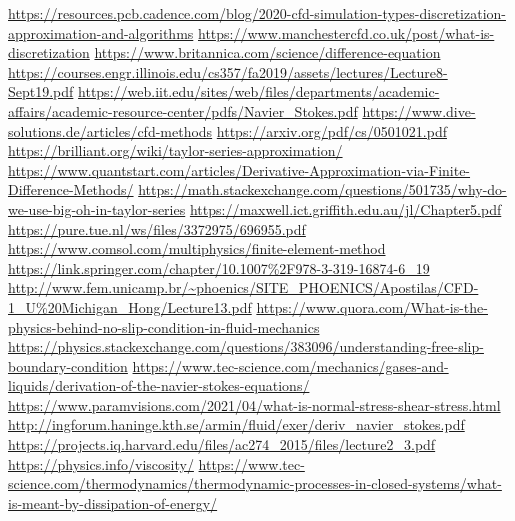 \documentclass{article}
\begin{document}
\newpage
\begin{thebibliography}{3}
\url{https://resources.pcb.cadence.com/blog/2020-cfd-simulation-types-discretization-approximation-and-algorithms}
\url{https://www.manchestercfd.co.uk/post/what-is-discretization}
\url{https://www.britannica.com/science/difference-equation}
\url{https://courses.engr.illinois.edu/cs357/fa2019/assets/lectures/Lecture8-Sept19.pdf}
\url{https://web.iit.edu/sites/web/files/departments/academic-affairs/academic-resource-center/pdfs/Navier_Stokes.pdf}
\url{https://www.dive-solutions.de/articles/cfd-methods}
\url{https://arxiv.org/pdf/cs/0501021.pdf}
\url{https://brilliant.org/wiki/taylor-series-approximation/}
\url{https://www.quantstart.com/articles/Derivative-Approximation-via-Finite-Difference-Methods/}
\url{https://math.stackexchange.com/questions/501735/why-do-we-use-big-oh-in-taylor-series}
\url{https://maxwell.ict.griffith.edu.au/jl/Chapter5.pdf}
\url{https://pure.tue.nl/ws/files/3372975/696955.pdf}
\url{https://www.comsol.com/multiphysics/finite-element-method}
\url{https://link.springer.com/chapter/10.1007\%2F978-3-319-16874-6\_19}
\url{http://www.fem.unicamp.br/~phoenics/SITE_PHOENICS/Apostilas/CFD-1_U\%20Michigan_Hong/Lecture13.pdf}
\url{https://www.quora.com/What-is-the-physics-behind-no-slip-condition-in-fluid-mechanics}
\url{https://physics.stackexchange.com/questions/383096/understanding-free-slip-boundary-condition}
\url{https://www.tec-science.com/mechanics/gases-and-liquids/derivation-of-the-navier-stokes-equations/}
\url{https://www.paramvisions.com/2021/04/what-is-normal-stress-shear-stress.html}
\url{http://ingforum.haninge.kth.se/armin/fluid/exer/deriv_navier_stokes.pdf}
\url{https://projects.iq.harvard.edu/files/ac274_2015/files/lecture2_3.pdf}
\url{https://physics.info/viscosity/}
\url{https://www.tec-science.com/thermodynamics/thermodynamic-processes-in-closed-systems/what-is-meant-by-dissipation-of-energy/}

\end{thebibliography}
\end{document}
